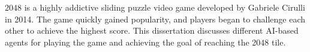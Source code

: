 2048 is a highly addictive sliding puzzle video game developed by Gabriele Cirulli in 2014. The game quickly gained popularity, and players began to challenge each other to achieve the highest score. This dissertation discusses different AI-based agents for playing the game and achieving the goal of reaching the 2048 tile.